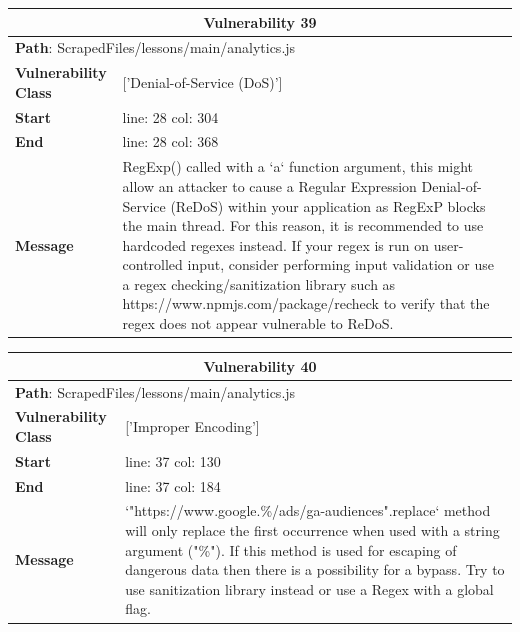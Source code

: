 \documentclass[12pt]{article}
\begin{document}
\vspace{0.7cm}
\FloatBarrier
\begin{table}[!h]
\centering
\renewcommand{\arraystretch}{1.3}
\begin{tabular}{|l|p{10cm}|}
\hline
\multicolumn{2}{|c|}{\textbf{Vulnerability 39}} \\
\hline
\multicolumn{2}{|l|}{\textbf{Path}: ScrapedFiles/lessons/main/analytics.js} \\
\hline
\textbf{Vulnerability Class} & ['Denial-of-Service (DoS)'] \\
\hline
\textbf{Start} & line: 28 \quad col: 304 \\
\hline
\textbf{End} & line: 28 \quad col: 368 \\
\hline
\textbf{Message} & RegExp() called with a `a` function argument, this might allow an attacker to cause a Regular Expression Denial-of-Service (ReDoS) within your application as RegExP blocks the main thread. For this reason, it is recommended to use hardcoded regexes instead. If your regex is run on user-controlled input, consider performing input validation or use a regex checking/sanitization library such as https://www.npmjs.com/package/recheck to verify that the regex does not appear vulnerable to ReDoS. \\
\hline
\end{tabular}
\end{table}
\vspace{0.7cm}
\FloatBarrier
\begin{table}[!h]
\centering
\renewcommand{\arraystretch}{1.3}
\begin{tabular}{|l|p{10cm}|}
\hline
\multicolumn{2}{|c|}{\textbf{Vulnerability 40}} \\
\hline
\multicolumn{2}{|l|}{\textbf{Path}: ScrapedFiles/lessons/main/analytics.js} \\
\hline
\textbf{Vulnerability Class} & ['Improper Encoding'] \\
\hline
\textbf{Start} & line: 37 \quad col: 130 \\
\hline
\textbf{End} & line: 37 \quad col: 184 \\
\hline
\textbf{Message} & `"https://www.google.\%/ads/ga-audiences".replace` method will only replace the first occurrence when used with a string argument ("\%"). If this method is used for escaping of dangerous data then there is a possibility for a bypass. Try to use sanitization library instead or use a Regex with a global flag. \\
\hline
\end{tabular}
\end{table}
\end{document}
